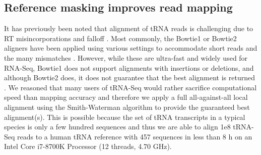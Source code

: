 \documentclass[9pt,lineno]{elife}
\begin{document}
\begin{figure}[ht!]
\label{figsupp:f2S10}
\end{figure}





 

\subsection{Reference masking improves read mapping}
It has previously been noted that alignment of tRNA reads is challenging due to RT misincorporations and falloff \citep{Hoffmann2018-uz, Behrens2021-gb}.
Most commonly, the Bowtie1 or Bowtie2 aligners have been applied using various settings to accommodate short reads and the many mismatches \citep{Cozen2015-cx, Zheng2015-kj, Clark2016-ph, Evans2017-st, Pinkard2020-yd}.
However, while these are ultra-fast and widely used for RNA-Seq, Bowtie1 does not support alignments with insertions or deletions, and although Bowtie2 does, it does not guarantee that the best alignment is returned \citep{Langmead2009-yx, Langmead2012-ui}.
We reasoned that many users of tRNA-Seq would rather sacrifice computational speed than mapping accuracy and therefore we apply a full all-against-all local alignment using the Smith-Waterman algorithm to provide the guaranteed best alignment(s).
This is possible because the set of tRNA transcripts in a typical species is only a few hundred sequences and thus we are able to align 1e8 tRNA-Seq reads to a human tRNA reference with 457 sequences in less than 8 h on an Intel Core i7-8700K Processor (12 threads, 4.70 GHz).
\end{document}
